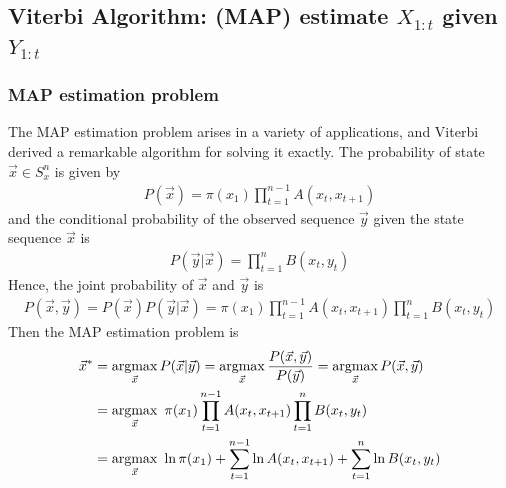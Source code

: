 \documentclass[11pt,a4paper]{article}
\newcommand{\argmax}{\operatornamewithlimits{argmax}}
\begin{document}
\subsection{Viterbi Algorithm: (MAP) estimate $X_{1:t}$ given $Y_{1:t}$}
\subsubsection{MAP estimation problem}
The MAP estimation problem arises in a variety of applications, and Viterbi derived a remarkable algorithm for solving it exactly. The probability of state $\vec{x}\in S_x^n$ is given by
\begin{equation}
    \begin{aligned}
        P(\vec{x})=\pi(x_1)\prod_{t=1}^{n-1}A(x_t,x_{t+1})
    \end{aligned}
    \nonumber
\end{equation}
and the conditional probability of the observed sequence $\vec{y}$ given the state sequence $\vec{x}$ is
\begin{equation}
    \begin{aligned}
        P(\vec{y}|\vec{x})=\prod_{t=1}^n B(x_t,y_t)
    \end{aligned}
    \nonumber
\end{equation}
Hence, the joint probability of $\vec{x}$ and $\vec{y}$ is
\begin{equation}
    \begin{aligned}
        P(\vec{x},\vec{y})=P(\vec{x})P(\vec{y}|\vec{x})=\pi(x_1)\prod_{t=1}^{n-1}A(x_t,x_{t+1})\prod_{t=1}^n B(x_t,y_t)
    \end{aligned}
    \nonumber
\end{equation}
Then the MAP estimation problem is
\begin{equation}
    \begin{aligned}
        \vec{x}^*&=\argmax_{\vec{x}}P(\vec{x}|\vec{y})=\argmax_{\vec{x}}\frac{P(\vec{x},\vec{y})}{P(\vec{y})}=\argmax_{\vec{x}}P(\vec{x},\vec{y})\\
        &=\argmax_{\vec{x}}\ \pi(x_1)\prod_{t=1}^{n-1}A(x_t,x_{t+1})\prod_{t=1}^n B(x_t,y_t)\\
        &=\argmax_{\vec{x}}\ \ln\pi(x_1)+\sum_{t=1}^{n-1}\ln A(x_t,x_{t+1})+\sum_{t=1}^n\ln B(x_t,y_t)
    \end{aligned}
    \nonumber
\end{equation}
\end{document}
